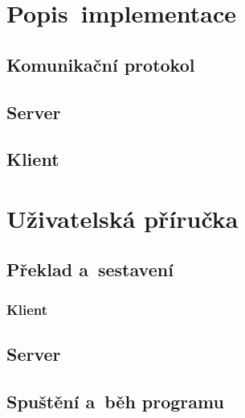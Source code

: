 \documentclass[12pt, a4paper]{article}
\begin{document}
\section{Popis~implementace} %

\subsection{Komunikační protokol}

\subsection{Server}

\subsection{Klient}

\section{Uživatelská příručka} %

\subsection{Překlad a~sestavení}

\subsubsection{Klient}

\subsection{Server}

\subsection{Spuštění a~běh programu}
\end{document}
